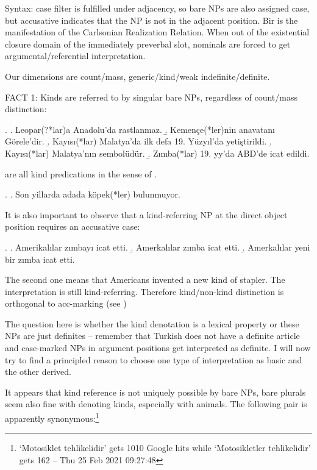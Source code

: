 \documentclass[11pt,a4paper]{article}
\begin{document}
Syntax: case filter is fulfilled under adjacency, so bare NPs are also assigned case, but accusative indicates that the NP is not in the adjacent position. Bir is the manifestation of the Carlsonian Realization Relation. When out of the existential closure domain of the immediately preverbal slot, nominals are forced to get argumental/referential interpretation.

\begin{comment}
Krifkaetal
* p87 incorporation and kind-reference.
\end{comment}

Our dimensions are count/mass, generic/kind/weak indefinite/definite.

FACT 1: Kinds are referred to by singular bare NPs, regardless of count/mass distinction:

\ex.
\a. Leopar(?*lar)a Anadolu'da rastlanmaz.
\b. Kemençe(*ler)nin anavatanı Görele'dir.
\b. Kayısı(*lar) Malatya'da ilk defa 19. Yüzyıl'da yetiştirildi. 
\b. Kayısı(*lar) Malatya'nın sembolüdür.
\b. Zımba(*lar) 19. yy'da ABD'de icat edildi.

are all kind predications in the sense of .


\ex.
\a. Son yillarda adada köpek(*ler) bulunmuyor.



It is also important to observe that a kind-referring NP at the direct object position requires an accusative case:

\ex.
\a. Amerikalılar zımbayı icat etti.
\b. Amerkalılar zımba icat etti.
\b. Amerkalılar yeni bir zımba icat etti.

The second one means that Americans invented a new kind of stapler. The interpretation is still kind-referring. Therefore kind/non-kind distinction is orthogonal to acc-marking (see )

The question here is whether the kind denotation is a lexical property or these NPs are just definites -- remember that Turkish does not have a definite article and case-marked NPs in argument positions get interpreted as definite. I will now try to find a principled reason to choose one type of interpretation as basic and the other derived.

It appears that kind reference is not uniquely possible by bare NPs, bare plurals seem also fine with denoting kinds, especially with animals. The following pair is apparently synonymous:\footnote{`Motosiklet tehlikelidir' gets 1010 Google hits while `Motosikletler tehlikelidir' gets 162 -- Thu 25 Feb 2021 09:27:48}
\end{document}
